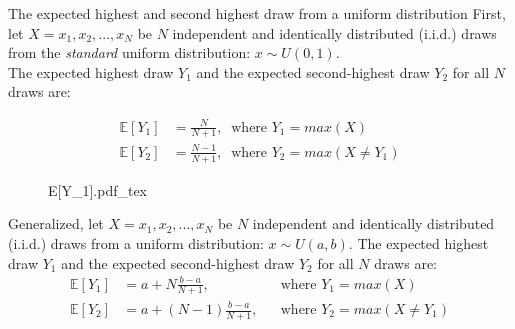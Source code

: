 \begin{frame}{The expected highest and second highest draw from a uniform distribution}
    First, let $X=x_1,x_2,...,x_N$ be $N$ independent and identically distributed (i.i.d.) draws from the \textit{standard} uniform distribution: $x\sim U(0, 1)$.\\\smallskip
    The expected highest draw $Y_1$ and the expected second-highest draw $Y_2$ for all $N$ draws are: \vspace{-10pt}
    \begin{multicols}{2}
      \begin{align*}
        \mathbb{E}[Y_1]&=\frac{N}{N+1},\ \text{ where }Y_1=max(X)\\
        \mathbb{E}[Y_2]&=\frac{N-1}{N+1},\ \text{ where }Y_2=max(X\neq Y_1)
      \end{align*}
      \vfill\null\columnbreak
      \begin{figure}[!h]
        \center
        \def\svgwidth{1.1\columnwidth}
        {E[Y_1].pdf_tex}
      \end{figure}
      \vfill\null
    \end{multicols} \vspace{-20pt}
    Generalized, let $X=x_1,x_2,...,x_N$ be $N$ independent and identically distributed (i.i.d.) draws from a uniform distribution: $x\sim U(a, b)$. The expected highest draw $Y_1$ and the expected second-highest draw $Y_2$ for all $N$ draws are:
    \begin{align*}
      \mathbb{E}[Y_1]&=a+N\frac{b-a}{N+1},&&\text{where }Y_1=max(X)\\
      \mathbb{E}[Y_2]&=a+(N-1)\frac{b-a}{N+1},&&\text{where }Y_2=max(X\neq Y_1)
    \end{align*}
\end{frame}

